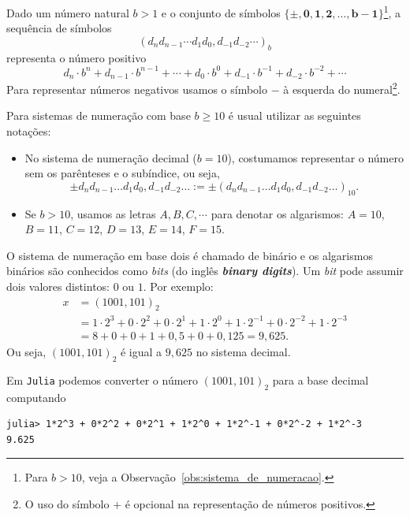 \begin{defn}\label{def:sistema_de_numeracao}
Dado um número natural $b>1$ e o conjunto de símbolos $\{\pmb{\pm},  \pmb{0}, \pmb{1}, \pmb{2},\dotsc, \pmb{b-1}\}$\footnote{Para $b>10$, veja a Observação~\ref{obs:sistema_de_numeracao}.}, a sequência de símbolos
\begin{equation}
  \left(d_nd_{n-1} \cdots d_1d_0,d_{-1}d_{-2} \cdots \right)_b
\end{equation}
representa o número positivo
\begin{equation}
  d_n\cdot b^n + d_{n-1}\cdot b^{n-1} + \cdots + d_0\cdot b^0 + d_{-1}\cdot b^{-1}+d_{-2}\cdot b^{-2} + \cdots
\end{equation}
Para representar números negativos usamos o símbolo $-$ à esquerda do numeral\footnote{O uso do símbolo $+$ é opcional na representação de números positivos.}.
\end{defn}

\begin{obs}[$b\geq 10$]\label{obs:sistema_de_numeracao}
Para sistemas de numeração com base $b \geq 10$ é usual utilizar as seguintes notações:
\begin{itemize}
\item No sistema de numeração decimal ($b=10$), costumamos representar o número sem os parênteses e o subíndice, ou seja,
\begin{equation}
  \pm d_nd_{n-1}\ldots d_1d_0,d_{-1}d_{-2}\ldots := \pm (d_nd_{n-1}\ldots d_1d_0,d_{-1}d_{-2}\ldots)_{10}.
\end{equation}
\item Se $b>10$, usamos as letras $A, B, C, \cdots$ para denotar os algarismos: $A=10$, $B=11$, $C=12$, $D=13$, $E=14$, $F=15$.
\end{itemize}
\end{obs}


\begin{ex} O sistema de numeração em base dois é chamado de binário e os algarismos binários são conhecidos como \textit{bits} (do inglês \textit{\bf{b}inary dig\bf{its}}). Um \textit{bit} pode assumir dois valores distintos: $0$ ou $1$. Por exemplo:
\begin{equation}
  \begin{split}
    x &= (1001,101)_{2} \\
    &= 1\cdot 2^3 +0\cdot 2^2 +0\cdot 2^1 +1\cdot 2^0  +1\cdot 2^{-1} +0\cdot 2^{-2} +1\cdot 2^{-3} \\
    &= 8+0+0+1+ 0,5+0+0,125 = 9,625.
  \end{split}
\end{equation}
Ou seja, $(1001,101)_{2}$ é igual a $9,625$ no sistema decimal.

Em \verb+Julia+ podemos converter o número $(1001,101)_2$ para a base decimal computando

\begin{lstlisting}
julia> 1*2^3 + 0*2^2 + 0*2^1 + 1*2^0 + 1*2^-1 + 0*2^-2 + 1*2^-3 
9.625
\end{lstlisting}

\end{ex}


